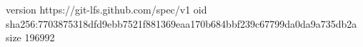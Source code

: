 version https://git-lfs.github.com/spec/v1
oid sha256:7703875318dfd9ebb7521f881369eaa170b684bbf239c67799da0da9a735db2a
size 196992
